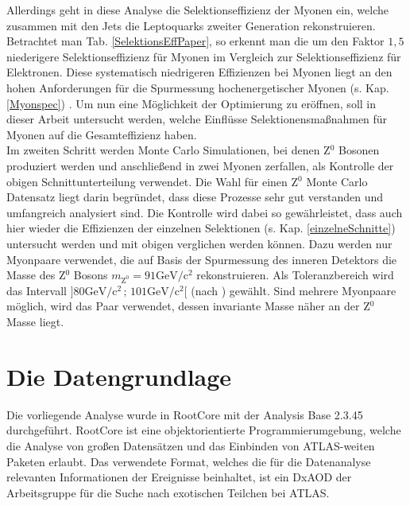 Allerdings geht in diese Analyse %
die Selektionseffizienz der Myonen ein, welche zusammen mit den Jets die Leptoquarks zweiter Generation rekonstruieren. Betrachtet man Tab. \ref{SelektionsEffPaper}, so erkennt man die um den Faktor $1{,}5$ niederigere Selektionseffizienz für Myonen im Vergleich zur Selektionseffizienz für Elektronen. Diese systematisch niedrigeren Effizienzen bei Myonen liegt an den hohen Anforderungen für die Spurmessung hochenergetischer Myonen (s. Kap. \ref{Myonspec}) \cite{LQATLAS}. Um nun eine Möglichkeit der Optimierung zu eröffnen, soll in dieser Arbeit untersucht werden, welche Einflüsse Selektionensmaßnahmen für Myonen auf die Gesamteffizienz haben.\\ %
Im zweiten Schritt werden Monte Carlo Simulationen, bei denen Z$^0$ Bosonen produziert werden und anschließend in zwei Myonen zerfallen, als Kontrolle der obigen Schnittunterteilung verwendet. Die Wahl für einen Z$^0$ Monte Carlo Datensatz liegt darin begründet, dass diese Prozesse sehr gut verstanden und umfangreich analysiert sind. Die Kontrolle wird dabei so gewährleistet, dass auch hier wieder die Effizienzen der einzelnen Selektionen (s. Kap. \ref{einzelneSchnitte}) untersucht werden und mit obigen verglichen werden können. Dazu werden nur Myonpaare verwendet, die auf Basis der Spurmessung des inneren Detektors die Masse des Z$^0$ Bosons $m_{\text{Z}^0}=91\text{GeV}/\text{c}^2$ rekonstruieren. Als Toleranzbereich wird das Intervall $]80\text{GeV}/\text{c}^2\,;\,101\text{GeV}/\text{c}^2[$ (nach \cite[S. 9]{MuPerNeu}) gewählt. Sind mehrere Myonpaare möglich, wird das Paar verwendet, dessen invariante Masse näher an der Z$^0$ Masse liegt. %
\section{Die Datengrundlage}%
Die vorliegende Analyse wurde in RootCore mit der Analysis Base 2.3.45 durchgeführt. RootCore ist eine objektorientierte Programmierumgebung, welche die Ana\-lyse von großen Datensätzen und das Einbinden von ATLAS-weiten Paketen erlaubt. Das verwendete Format, welches die für die Datenanalyse relevanten Informationen der Ereignisse beinhaltet, ist ein DxAOD der Arbeitsgruppe für die Suche nach exotischen Teilchen bei ATLAS.


